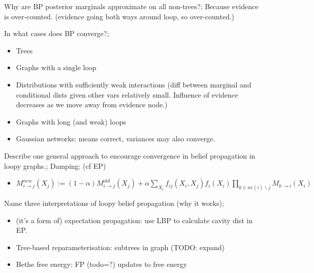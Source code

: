 \documentclass{article}
\begin{document}
Why are BP posterior marginals approximate on all non-trees?; Because evidence is over-counted. (evidence going both ways around loop, so over-counted.)

In what cases does BP converge?; \begin{itemize}
    \item Trees
    \item Graphs with a single loop
    \item Distributions with sufficiently weak interactions (diff between marginal and conditional dists given other vars relatively small. Influence of evidence decreases as we move away from evidence node.)
    \item Graphs with long (and weak) loops
    \item Gaussian networks: means correct, variances may also converge.
\end{itemize}

Describe one general approach to encourage convergence in belief propagation in loopy graphs.; Damping: (cf EP) \begin{itemize}
        \item $M^{new}_{i\rightarrow j}(X_j):= (1-\alpha)M^{old}_{i\rightarrow j}(X_j) + \alpha\sum_{X_i}f_{ij}(X_i, X_j)f_i(X_i)\prod_{k\in ne(i)\backslash j}M_{k\rightarrow i}(X_i)$
    \end{itemize} 

Name three interpretations of loopy belief propagation (why it works); \begin{itemize}
    \item (it's a form of) expectation propagation: use LBP to calculate cavity dist in EP.
    \item Tree-based reparameterisation: subtrees in graph (TODO: expand)
    \item Bethe free energy: FP (todo=?) updates to free energy
\end{itemize}
\end{document}
